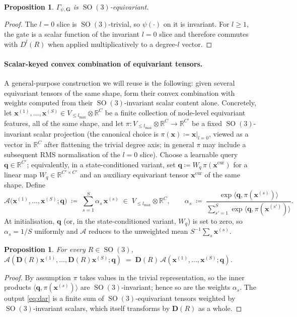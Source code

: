\documentclass[11pt,a4paper]{article}
\DeclareMathOperator{\SO}{SO}
\newcommand{\R}{\mathbb{R}}
\newcommand{\bG}{\bm{G}}
\newcommand{\bx}{\bm{x}}
\newcommand{\bD}{\bm{D}}
\newcommand{\lmax}{l_{\max}}
\theoremstyle{plain}
\newtheorem{proposition}[theorem]{Proposition}
\theoremstyle{definition}
\theoremstyle{remark}
\begin{document}
    \begin{proposition}
$\Gamma_{\psi,\bG}$ is $\SO(3)$-equivariant.
    \end{proposition}
    \begin{proof}
    The $l=0$ slice is $\SO(3)$-trivial, so $\psi(\cdot)$ on it is invariant.
    For $l\ge 1$, the gate is a scalar function of the invariant $l=0$ slice and therefore commutes with $D^l(R)$ when applied multiplicatively to a degree-$l$ vector.
    \end{proof}

    \paragraph{Scalar-keyed convex combination of equivariant tensors.}\label{sec:dar}
    A general-purpose construction we will reuse is the following: given several
    equivariant tensors of the same shape, form their convex combination with
    weights computed from their $\SO(3)$-invariant scalar content alone.
    Concretely, let $\bx^{(1)},\dots,\bx^{(S)}\in V_{\le\lmax}\otimes\R^C$ be a
    finite collection of node-level equivariant features, all of the same shape,
    and let $\pi:V_{\le\lmax}\otimes\R^C\to\R^{C'}$ be a fixed $\SO(3)$-invariant
    scalar projection (the canonical choice is $\pi(\bx)\coloneqq\bx|_{l=0}$,
    viewed as a vector in $\R^{C}$ after flattening the trivial degree axis; in
    general $\pi$ may include a subsequent RMS normalisation of the $l=0$ slice).
    Choose a learnable query $\bm{q}\in\R^{C'}$; equivalently, in a
    state-conditioned variant, set $\bm{q}\coloneqq W_q\,\pi(\bx^{\mathrm{cur}})$
    for a linear map $W_q\in\R^{C'\times C'}$ and an auxiliary equivariant tensor
$\bx^{\mathrm{cur}}$ of the same shape. Define
    \begin{equation}\label{eq:dar}
        \mathcal{A}\bigl(\bx^{(1)},\dots,\bx^{(S)};\bm{q}\bigr)
        \;\coloneqq\;
        \sum_{s=1}^{S}\alpha_s\,\bx^{(s)}\;\in\;V_{\le\lmax}\otimes\R^C,
        \qquad
        \alpha_s\;\coloneqq\;\frac{\exp\!\langle\bm{q},\pi(\bx^{(s)})\rangle}{\sum_{s'=1}^{S}\exp\!\langle\bm{q},\pi(\bx^{(s')})\rangle}.
    \end{equation}
    At initialisation, $\bm{q}$ (or, in the state-conditioned variant, $W_q$) is set to zero, so $\alpha_s=1/S$ uniformly and $\mathcal{A}$ reduces to the unweighted mean $S^{-1}\sum_s\bx^{(s)}$.

    \begin{proposition}\label{prop:dar-eq}
    For every $R\in\SO(3)$,
$\mathcal{A}(\bD(R)\bx^{(1)},\dots,\bD(R)\bx^{(S)};\bm{q})\;=\;\bD(R)\,\mathcal{A}(\bx^{(1)},\dots,\bx^{(S)};\bm{q})$.
    \end{proposition}
    \begin{proof}
    By assumption $\pi$ takes values in the trivial representation, so the inner products $\langle\bm{q},\pi(\bx^{(s)})\rangle$ are $\SO(3)$-invariant; hence so are the weights $\alpha_s$.
    The output \eqref{eq:dar} is a finite sum of $\SO(3)$-equivariant tensors weighted by $\SO(3)$-invariant scalars, which itself transforms by $\bD(R)$ as a whole.
    \end{proof}
\end{document}
